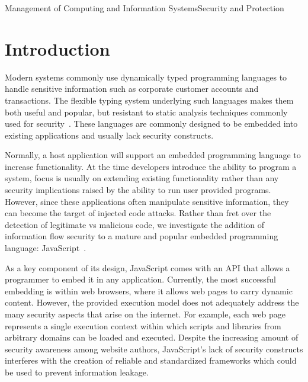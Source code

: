 \documentclass[preprint]{sigplanconf}
\begin{document}
 {Management of Computing and Information Systems}{Security and Protection}


\section{Introduction}
\label{sec:introduction}
Modern systems commonly use dynamically typed programming languages to handle sensitive information such as corporate customer accounts and transactions.
The flexible typing system underlying such languages makes them both useful and popular, but resistant to static analysis techniques commonly used for security~\cite{363526}.
These languages are commonly designed to be embedded into existing applications and usually lack security constructs.

Normally, a host application will support an embedded programming language to increase functionality.
At the time developers introduce the ability to program a system, focus is usually on extending existing functionality rather than any security implications raised by the ability to run user provided programs.
However, since these applications often manipulate sensitive information, they can become the target of injected code attacks.
Rather than fret over the detection of legitimate vs malicious code, we investigate the addition of information flow security to a mature and popular embedded programming language: JavaScript~\cite{ecma}.

As a key component of its design, JavaScript comes with an API that allows a programmer to embed it in any application.
Currently, the most successful embedding is within web browsers, where it allows web pages to carry dynamic content.
However, the provided execution model does not adequately address the many security aspects that arise on the internet.
For example, each web page represents a single execution context within which scripts and libraries from arbitrary domains can be loaded and executed. 
Despite the increasing amount of security awareness among website authors, JavaScript's lack of security constructs interferes with the creation of reliable and standardized frameworks which could be used to prevent information leakage.
\end{document}

